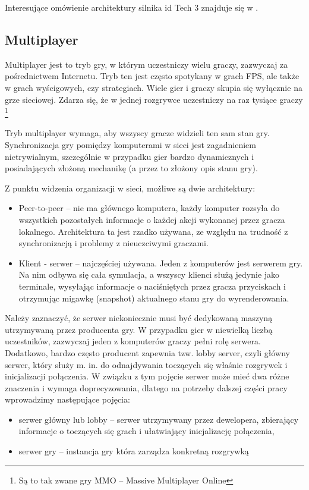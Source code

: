 Interesujące omówienie architektury silnika id Tech 3 znajduje się w \cite{q3-code-reviev}.

\subsection{Multiplayer}
\label{ssec:multiplayer}

Multiplayer jest to tryb gry, w którym uczestniczy wielu graczy, zazwyczaj za
pośrednictwem Internetu. Tryb ten jest często spotykany w grach FPS, ale także
w grach wyścigowych, czy strategiach. Wiele gier i graczy skupia się wyłącznie
na grze sieciowej. Zdarza się, że w jednej rozgrywce uczestniczy na raz
tysiące graczy \footnote {Są to tak zwane gry MMO -- Massive Multiplayer Online}

Tryb multiplayer wymaga, aby wszyscy gracze widzieli ten sam stan gry.
Synchronizacja gry pomiędzy komputerami w sieci jest zagadnieniem nietrywialnym,
szczególnie w przypadku gier bardzo dynamicznych i posiadających złożoną mechanikę
(a przez to złożony opis stanu gry).

Z punktu widzenia organizacji w sieci, możliwe są dwie architektury:
\begin{itemize}
\item Peer-to-peer -- nie ma głównego komputera, każdy komputer rozsyła do wszystkich
  pozostałych informacje o każdej akcji wykonanej przez gracza lokalnego. Architektura
  ta jest rzadko używana, ze względu na trudność z synchronizacją i problemy z
  nieuczciwymi graczami.
\item Klient - serwer -- najczęściej używana. Jeden z komputerów jest serwerem
  gry. Na nim odbywa się cała symulacja, a wszyscy klienci służą jedynie jako
  terminale, wysyłając informacje o naciśniętych przez gracza przyciskach
  i otrzymując migawkę (snapshot) aktualnego stanu gry do wyrenderowania.
\end {itemize}

Należy zaznaczyć, że serwer niekoniecznie musi być dedykowaną maszyną utrzymywaną
przez producenta gry. W przypadku gier w niewielką liczbą uczestników,
zazwyczaj jeden z komputerów graczy pełni rolę serwera. Dodatkowo, bardzo
często producent zapewnia tzw. lobby server, czyli główny serwer,
który służy m. in. do odnajdywania toczących się właśnie rozgrywek
i inicjalizacji połączenia. W związku z tym pojęcie serwer może mieć
dwa różne znaczenia i wymaga doprecyzowania, dlatego na potrzeby dalszej części pracy
wprowadzimy następujące pojęcia:
\begin{itemize}
\item serwer główny lub lobby -- serwer utrzymywany przez dewelopera, zbierający
  informacje o toczących się grach i ułatwiający inicjalizację połączenia,
\item serwer gry -- instancja gry która zarządza konkretną rozgrywką
\end{itemize}

